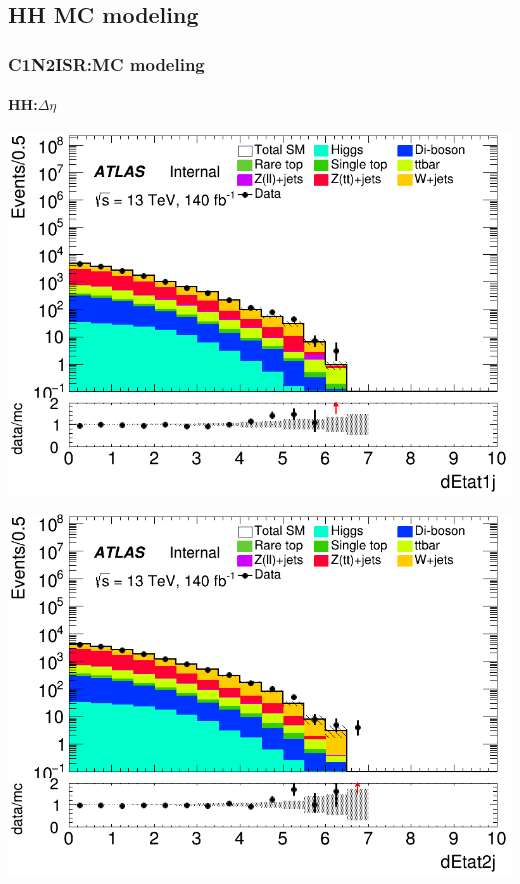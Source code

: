 \documentclass[usenames,dvipsnames]{beamer}
\begin{document}
\subsection{HH MC modeling}
\begin{frame}
\frametitle{C1N2ISR:MC modeling}
\framesubtitle{HH:\quad $\Delta\eta$}
    \begin{minipage}{0.32\textwidth}
        \centering
        \includegraphics[width=\textwidth]{graphics/HH_met/HH_met_dEtat1j.png}
    \end{minipage}
    \hfill
    \begin{minipage}{0.32\textwidth}
        \centering
        \includegraphics[width=\textwidth]{graphics/HH_met/HH_met_dEtat2j.png}
    \end{minipage}
    \hfill

\end{frame}
\end{document}
